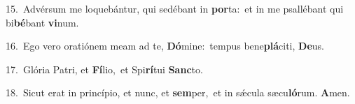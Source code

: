 {\numbfont\textcolor{\numbcolor}{15.}}~Advérsum me loquebántur, qui sedébant in \textbf{por}\-ta:~\star et in me psallébant qui bi\-\textbf{bé}\-bant \textbf{vi}\-num.\par
{\numbfont\textcolor{\numbcolor}{16.}}~Ego vero oratiónem meam ad te, \textbf{Dó}\-mine:~\star tempus bene\-\textbf{plá}\-citi, \textbf{De}\-us.\par
{\numbfont\textcolor{\numbcolor}{17.}}~Glória Patri, et \textbf{Fí}\-lio,~\star et Spi\-\textbf{rí}\-tui \textbf{Sanc}\-to.\par
{\numbfont\textcolor{\numbcolor}{18.}}~Sicut erat in princípio, et nunc, et \textbf{sem}\-per,~\star et in sǽcula sæcu\-\textbf{ló}\-rum. \textbf{A}\-men.\par
